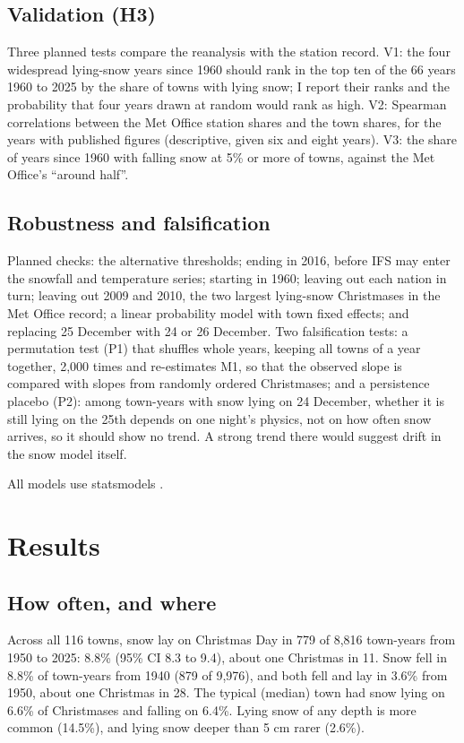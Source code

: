 \documentclass[11pt,a4paper]{article}
\begin{document}
\subsection{Validation (H3)}
Three planned tests compare the reanalysis with the station record. V1: the four widespread lying-snow years since 1960 should rank in the top ten of the 66 years 1960 to 2025 by the share of towns with lying snow; I report their ranks and the probability that four years drawn at random would rank as high. V2: Spearman correlations between the Met Office station shares and the town shares, for the years with published figures (descriptive, given six and eight years). V3: the share of years since 1960 with falling snow at 5\% or more of towns, against the Met Office's ``around half''.

\subsection{Robustness and falsification}
Planned checks: the alternative thresholds; ending in 2016, before IFS may enter the snowfall and temperature series; starting in 1960; leaving out each nation in turn; leaving out 2009 and 2010, the two largest lying-snow Christmases in the Met Office record; a linear probability model with town fixed effects; and replacing 25 December with 24 or 26 December. Two falsification tests: a permutation test (P1) that shuffles whole years, keeping all towns of a year together, 2,000 times and re-estimates M1, so that the observed slope is compared with slopes from randomly ordered Christmases; and a persistence placebo (P2): among town-years with snow lying on 24 December, whether it is still lying on the 25th depends on one night's physics, not on how often snow arrives, so it should show no trend. A strong trend there would suggest drift in the snow model itself.

All models use statsmodels \citep{seabold2010}.

\section{Results}\label{sec:results}
\subsection{How often, and where}
Across all 116 towns, snow lay on Christmas Day in 779 of 8,816 town-years from 1950 to 2025: 8.8\% (95\% CI 8.3 to 9.4), about one Christmas in 11. Snow fell in 8.8\% of town-years from 1940 (879 of 9,976), and both fell and lay in 3.6\% from 1950, about one Christmas in 28. The typical (median) town had snow lying on 6.6\% of Christmases and falling on 6.4\%. Lying snow of any depth is more common (14.5\%), and lying snow deeper than 5 cm rarer (2.6\%).
\end{document}
